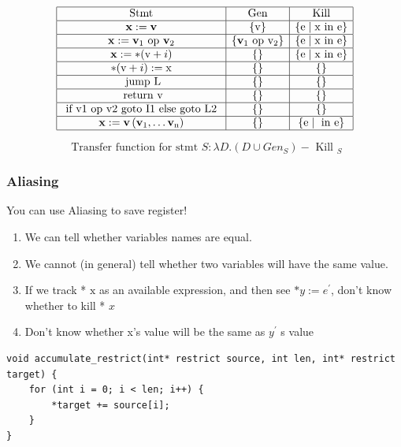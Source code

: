 \documentclass[a4paper]{article}
\theoremstyle{definition}
\begin{document}
$$\begin{array}{|c|c|c|}
\hline \text { Stmt } & \text { Gen } & \text { Kill } \\
\hline \mathbf{x}:=\mathbf{v} & \{\mathrm{v}\} & \{\mathrm{e} \mid \mathrm{x} \text { in } \mathrm{e}\} \\
\hline \mathbf{x}:=\mathbf{v}_{1} \text { op } \mathbf{v}_{2} & \left\{\mathbf{v}_{1} \text { op } \mathrm{v}_{2}\right\} & \{\mathrm{e} \mid \mathrm{x} \text { in } \mathrm{e}\} \\
\hline \mathbf{x}:=*(\mathrm{v}+i) & \{\} & \{\mathrm{e} \mid \mathrm{x} \text { in } \mathrm{e}\} \\
\hline *(\mathrm{v}+i):=\mathrm{x} & \{\} & \{\} \\
\hline \text { jump } \mathrm{L} & \{\} & \{\} \\
\hline \text { return } \mathrm{v} & \{\} & \{\} \\
\hline \text { if v1 op v2 goto I1 else goto L2 } & \{\} & \{\} \\
\hline \mathbf{x}:=\mathbf{v}\left(\mathbf{v}_{1}, \ldots \mathbf{v}_{\mathrm{n}}\right) & \{\} & \{\mathrm{e} \mid \text { in } \mathrm{e}\} \\
\hline
\end{array}$$

$$\text { Transfer function for stmt } S: \lambda D .\left(D \cup G e n_{S}\right)-\text { Kill }_{S}$$
\subsubsection{Aliasing}
You can use Aliasing to save register!
\begin{enumerate}
    \item We can tell whether variables names are equal.
\item We cannot (in general) tell whether two variables will have the same value.
\item If we track * $\mathrm{x}$ as an available expression, and then see $* y:=e^{\prime}$, don't know whether to kill * $x$
\item Don't know whether x's value will be the same as $y^{\prime}$ s value
\end{enumerate}
\begin{verbatim}
void accumulate_restrict(int* restrict source, int len, int* restrict target) {
    for (int i = 0; i < len; i++) {
        *target += source[i];
    }
}
\end{verbatim}
\end{document}
